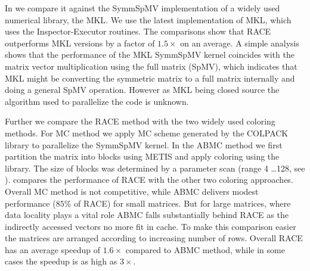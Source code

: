 In  we compare it against the \acrshort{SymmSpMV} 
implementation of a widely used numerical library, the \acrshort{MKL}. 
We use the latest implementation of MKL, which uses the Inspector-Executor routines.
The comparisons show that \acrshort{RACE} outperforms MKL
versions by a factor of $1.5\times$ on an average. 
A simple analysis
shows that the performance of the \acrshort{MKL} \acrshort{SymmSpMV} 
kernel coincides with the matrix vector multiplication using the full
matrix (\acrshort{SpMV}), which indicates that MKL might be converting
the symmetric matrix to a full matrix internally and doing a general \acrshort{SpMV}
operation. However as MKL being closed source  the algorithm 
used to parallelize the code is unknown.

Further we compare the \acrshort{RACE} method with the two widely used
coloring methods. For \acrshort{MC} method we apply \acrlong{MC} scheme
generated by the COLPACK \cite{COLPACK} library to parallelize the \acrshort{SymmSpMV}
kernel. In the \acrshort{ABMC} method we first partition the matrix into blocks
using METIS \cite{METIS} and apply coloring using the \COLPACK library. The
size of blocks was determined by a parameter scan (range 4 \ldots 128, see \cite{ABMC}).
 compares the performance of \acrshort{RACE} with the other 
two coloring approaches.
Overall \acrshort{MC} method is not competitive, while \acrshort{ABMC} delivers
modest performance ($85 \%$ of \acrshort{RACE}) for small matrices. But for large
matrices,  where data locality plays a vital role \acrshort{ABMC} 
falls substantially behind \acrshort{RACE} as the indirectly
accessed vectors no more fit in cache. To make this comparison easier
the matrices are arranged according to increasing number of rows.
Overall \acrshort{RACE} has an average speedup of $1.6\times$ compared to 
\acrshort{ABMC} method, while in some cases the speedup is as high as $3\times$.





